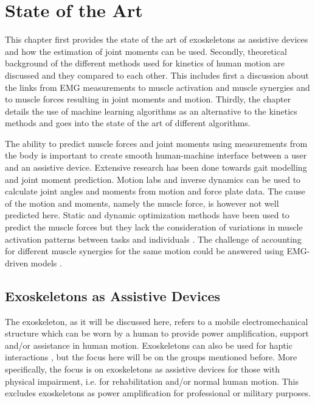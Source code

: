 \section{State of the Art}
This chapter first provides the state of the art of exoskeletons as assistive devices and how the estimation of joint moments can be used. 
Secondly, theoretical background of the different methods used for kinetics of human motion are discussed and they compared to each other.
This includes first a discussion about the links from EMG measurements to muscle activation and muscle synergies and to muscle forces resulting in joint moments and motion.
Thirdly, the chapter details the use of machine learning algorithms as an alternative to the kinetics methods and goes into the state of the art of different algorithms.

The ability to predict muscle forces and joint moments using measurements from the body is important to create smooth human-machine interface between a user and an assistive device.
Extensive research has been done towards gait modelling and joint moment prediction. 
Motion labs and inverse dynamics can be used to calculate joint angles and moments from motion and force plate data. 
The cause of the motion and moments, namely the muscle force, is however not well predicted here. 
Static and dynamic optimization methods have been used to predict the muscle forces but they lack the consideration of variations in muscle activation patterns between tasks and individuals \cite{Pizzolato2015, Sartori2012a}. 
The challenge of accounting for different muscle synergies for the same motion could be answered using EMG-driven models \cite{Pizzolato2015, Sartori2012a}.

\subsection{Exoskeletons as Assistive Devices}
\label{sec:A-Exoskeletons}
The exoskeleton, as it will be discussed here, refers to a mobile electromechanical structure which can be worn by a human to provide power amplification, support and/or assistance in human motion. Exoskeletons can also be used for haptic interactions \cite{Anam2012}, but the focus here will be on the groups mentioned before. More specifically, the focus is on exoskeletons as assistive devices for those with physical impairment, i.e. for rehabilitation and/or normal human motion. This excludes exoskeletons as power amplification for professional or military purposes.


